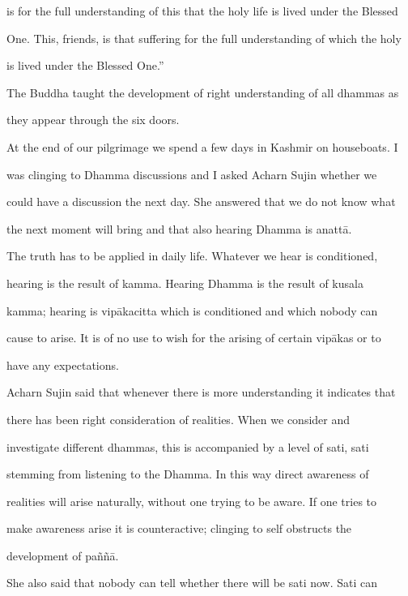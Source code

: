       is for the full understanding of this that the holy life is lived under the Blessed  

      One. This, friends, is that suffering for the full understanding of which the holy  

      is lived under the Blessed One.” 



The Buddha taught the development of right understanding of all dhammas as  

they appear through the six doors. 



At the end of our pilgrimage we spend a few days in Kashmir on houseboats. I  

was  clinging  to  Dhamma  discussions  and  I  asked Acharn  Sujin whether we  

could have a discussion the next day. She answered that we do not know what  

the next moment will bring and that also hearing Dhamma is anattā. 

   The truth has to be applied in daily life. Whatever we hear is conditioned,  

hearing   is   the   result   of   kamma.   Hearing   Dhamma   is   the   result   of   kusala  

kamma;  hearing  is vipākacitta   which  is  conditioned  and  which   nobody  can  

cause to  arise.  It  is  of no use to wish for the  arising  of  certain vipākas  or to  

have any expectations. 



Acharn Sujin said that whenever there is more understanding it indicates that  

there   has   been   right   consideration   of   realities.   When   we   consider   and  

investigate  different   dhammas,  this   is  accompanied  by   a  level  of  sati,  sati  

stemming   from  listening  to   the  Dhamma.  In  this   way  direct  awareness  of  

realities will  arise  naturally, without  one  trying  to be  aware.  If  one  tries  to  

make   awareness   arise   it   is   counteractive;   clinging   to   self   obstructs   the  

development of paññā. 

   She also said that nobody can tell whether there will be sati now.  Sati can  

